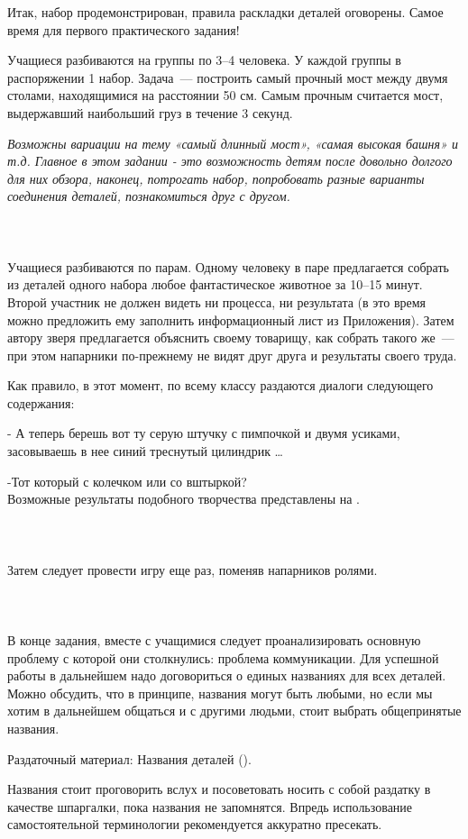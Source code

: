 Итак, набор продемонстрирован, правила раскладки деталей оговорены. Самое время для первого практического задания!

Учащиеся разбиваются на группы по 3--4 человека. У каждой группы в распоряжении 1 набор. Задача~--- построить самый прочный мост между двумя столами, находящимися на расстоянии 50 см. Самым прочным считается мост, выдержавший наибольший груз в течение 3 секунд.

{\slshape Возможны вариации на тему «самый длинный мост», «самая высокая башня» и т.д. Главное в этом задании - это возможность детям  после довольно долгого для них обзора, наконец, потрогать набор, попробовать разные варианты соединения деталей, познакомиться друг с другом.}\\\\

{\hypertarget{lesson2x4}{}}\\\\

Учащиеся  разбиваются по парам. Одному человеку в паре предлагается собрать из деталей одного набора любое фантастическое животное за 10--15 минут. Второй участник не должен видеть ни процесса, ни результата (в это время можно предложить ему заполнить информационный лист из Приложения). Затем автору зверя предлагается объяснить своему товарищу, как собрать такого же~--- при этом напарники по-прежнему не видят друг друга и результаты своего труда.

Как правило, в этот момент, по всему классу раздаются диалоги следующего содержания:

- А теперь берешь вот ту серую штучку с пимпочкой и двумя усиками, засовываешь в нее синий треснутый цилиндрик \dots 

-Тот который с колечком или со вштыркой?\\
Возможные результаты подобного творчества представлены на .\\\\
\\\\

Затем следует провести игру еще раз, поменяв напарников ролями.\\\\

{\hypertarget{lesson2x5}{}}\\\\

В конце задания, вместе с учащимися следует проанализировать основную проблему с которой они столкнулись: проблема коммуникации. Для успешной работы в дальнейшем надо договориться о единых названиях для всех деталей. Можно обсудить, что в принципе, названия могут быть любыми, но если мы хотим  в дальнейшем общаться и с другими людьми, стоит выбрать общепринятые названия.

Раздаточный материал: Названия деталей ().

Названия стоит проговорить вслух и посоветовать носить с собой раздатку в качестве шпаргалки, пока названия не запомнятся. Впредь использование самостоятельной терминологии рекомендуется аккуратно пресекать.